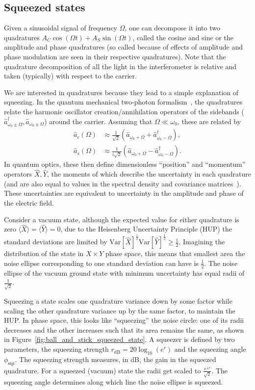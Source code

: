 \documentclass[aps,pra,superscriptaddress,reprint,nofootinbib]{revtex4-1}
\begin{document}
\subsection{Squeezed states}

Given a sinusoidal signal of frequency $\Omega$, one can decompose it into two quadratures $A_C \cos(\Omega t) + A_S \sin(\Omega t)$, called the cosine and sine or the amplitude and phase quadratures (so called because of effects of amplitude and phase modulation are seen in their respective quadratures). Note that the quadrature decomposition of all the light in the interferometer is relative and taken (typically) with respect to the carrier.


We are interested in quadratures because they lead to a simple explanation of squeezing. In the quantum mechanical two-photon formalism~\cite{Danilishin_2012}, the quadratures relate the harmonic oscillator creation/annihilation operators of the sidebands ($\hat{a}_{\omega_0 \pm \Omega}^\dagger, \hat{a}_{\omega_0 \pm \Omega}$) around the carrier. Assuming that $\Omega \ll \omega_0$, these are related by
\begin{align}
\hat{a}_c(\Omega) &\approx \frac{1}{\sqrt{2}} (\hat{a}_{\omega_0 + \Omega} + \hat{a}_{\omega_0 - \Omega}^\dagger),\\
\hat{a}_s(\Omega) &\approx \frac{1}{i \sqrt{2}} (\hat{a}_{\omega_0 + \Omega} - \hat{a}_{\omega_0 - \Omega}^\dagger).
\end{align}
In quantum optics, these then define dimensionless “position” and “momentum” operators $\hat{X}, \hat{Y}$, the moments of which describe the uncertainty in each quadrature (and are also equal to values in the spectral density and covariance matrices~\cite{Danilishin_2012}). These uncertainties are equivalent to uncertainty in the amplitude and phase of the electric field.


Consider a vacuum state, although the expected value for either quadrature is zero $\langle \hat{X} \rangle = \langle \hat{Y} \rangle = 0$, due to the Heisenberg Uncertainty Principle (HUP) the standard deviations are limited by $\mathrm{Var}[\hat{X}]^{\frac{1}{2}} \mathrm{Var}[\hat{Y}]^{\frac{1}{2}} \geq \frac{1}{2}$. Imagining the distribution of the state in $X \times Y$ phase space, this means that smallest area the noise ellipse corresponding to one standard deviation can have is $\frac{1}{2}$. The noise ellipse of the vacuum ground state with minimum uncertainty has equal radii of $\frac{1}{\sqrt{2}}$.


Squeezing a state scales one quadrature variance down by some factor while scaling the other quadrature variance up by the same factor, to maintain the HUP. In phase space, this looks like “squeezing” the noise circle: one of its radii decreases and the other increases such that its area remains the same, as shown in Figure~\ref{fig:ball_and_stick_squeezed_state}. A squeezer is defined by two parameters, the squeezing strength $r_{\mathrm{dB}} = 20 \log_{10}(e^r)$ and the squeezing angle $\phi_{\mathrm{sqz}}$. The squeezing strength measures, in dB, the gain in the squeezed quadrature. For a squeezed (vacuum) state the radii get scaled to $\frac{e^{\pm r}}{\sqrt{2}}$. The squeezing angle determines along which line the noise ellipse is squeezed.
\end{document}
